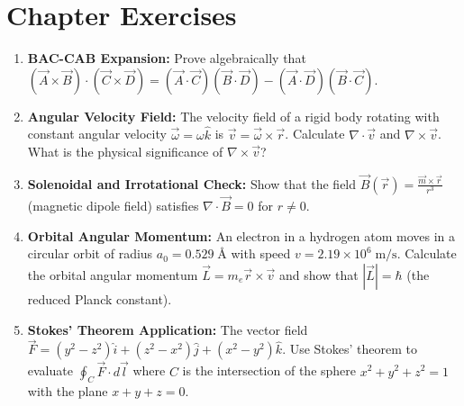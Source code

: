 \section{Chapter Exercises}
\begin{enumerate}
    \item \textbf{BAC-CAB Expansion:} Prove algebraically that $(\vec{A} \times \vec{B}) \cdot (\vec{C} \times \vec{D}) = (\vec{A} \cdot \vec{C})(\vec{B} \cdot \vec{D}) - (\vec{A} \cdot \vec{D})(\vec{B} \cdot \vec{C})$.
    \item \textbf{Angular Velocity Field:} The velocity field of a rigid body rotating with constant angular velocity $\vec{\omega} = \omega\hat{k}$ is $\vec{v} = \vec{\omega} \times \vec{r}$. Calculate $\nabla \cdot \vec{v}$ and $\nabla \times \vec{v}$. What is the physical significance of $\nabla \times \vec{v}$?
    \item \textbf{Solenoidal and Irrotational Check:} Show that the field $\vec{B}(\vec{r}) = \frac{\vec{m} \times \vec{r}}{r^3}$ (magnetic dipole field) satisfies $\nabla \cdot \vec{B} = 0$ for $r \neq 0$.
    \item \textbf{Orbital Angular Momentum:} An electron in a hydrogen atom moves in a circular orbit of radius $a_0 = 0.529\;\text{\AA}$ with speed $v = 2.19 \times 10^6\;\text{m/s}$. Calculate the orbital angular momentum $\vec{L} = m_e\vec{r} \times \vec{v}$ and show that $|\vec{L}| = \hbar$ (the reduced Planck constant).
    \item \textbf{Stokes' Theorem Application:} The vector field $\vec{F} = (y^2 - z^2)\hat{i} + (z^2 - x^2)\hat{j} + (x^2 - y^2)\hat{k}$. Use Stokes' theorem to evaluate $\oint_C \vec{F} \cdot d\vec{l}$ where $C$ is the intersection of the sphere $x^2 + y^2 + z^2 = 1$ with the plane $x + y + z = 0$.
\end{enumerate}

